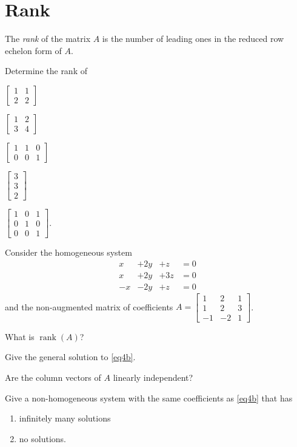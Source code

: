 \documentclass[14pt]{problemset}
\newcommand{\Rank}{\operatorname{rank}}
\newcommand{\mat}[1]{\begin{bmatrix}#1\end{bmatrix}}
\begin{document}
\section*{Rank}
	\begin{definition}[Rank]
		The \emph{rank} of the matrix $A$ is the number of leading ones in the 
		reduced row echelon form of $A$.
	\end{definition}

	\question
	\begin{parts}
		\item Determine the rank of
		\begin{enumerate*}
			\item $\mat{1&1\\2&2}$
			\item $\mat{1&2\\3&4}$
			\item $\mat{1&1&0\\0&0&1}$
			\item $\mat{3\\3\\2}$
			\item $\mat{1&0&1\\0&1&0\\0&0&1}$.
		\end{enumerate*}
	\end{parts}
	
	\newpage
	\question
	Consider the homogeneous system 
		\begin{equation}\label{eq4b}
			\begin{array}{llll}
				x&+2y&+z &= 0\\
				x&+2y&+3z &= 0\\
				-x&-2y&+z &= 0
			\end{array}
		\end{equation}
	and the non-augmented matrix of coefficients $A=\mat{1&2&1\\1&2&3\\-1&-2&1}$.
	\begin{parts}
		\item What is $\Rank(A)$?
		\item Give the general solution to \eqref{eq4b}.
		\item Are the column vectors of $A$ linearly independent?
		\item Give a non-homogeneous system with the same coefficients as \eqref{eq4b} that has
			\begin{enumerate}
				\item infinitely many solutions
				\item no solutions.
			\end{enumerate}
	\end{parts}
\end{document}
